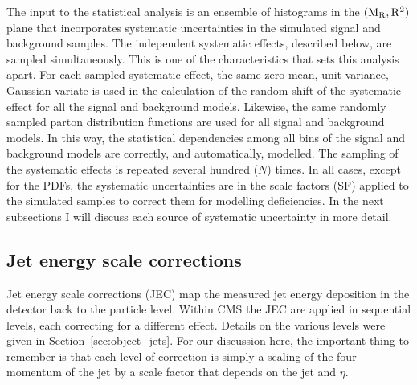 
 
The input to the statistical analysis is an ensemble of histograms in the $(\mathrm{M_R},\mathrm{R^2})$ plane that 
incorporates systematic uncertainties in the simulated signal and background samples.  
The independent systematic effects, described below, are sampled simultaneously. 
This is one of the characteristics that sets this analysis apart. 
For each sampled systematic effect, the same zero mean, unit variance, Gaussian variate is used in
the calculation of the random shift of the systematic effect for all the signal and background
models. Likewise, the same randomly sampled parton distribution functions are used for all
signal and background models. 
In this way, the statistical dependencies among all bins of the signal and background models are
correctly, and automatically, modelled. The sampling of the systematic effects
is repeated several hundred ($N$) times.  
In all cases, except for the PDFs, the systematic uncertainties are in the scale factors (SF) 
applied to the simulated samples to correct them for modelling deficiencies. 
In the next subsections I will discuss each source of systematic uncertainty in more detail. 




\subsection{Jet energy scale corrections \label{sec:boost_JEC}}  

Jet energy scale corrections (JEC) map the measured jet energy deposition in the detector back to
the particle level. Within CMS the JEC are applied in sequential levels, each correcting for a
different effect. Details on the various levels were given in Section~\ref{sec:object_jets}.
For our discussion here, the important thing to remember is that each level of correction is simply
a scaling of the four-momentum of the jet by a scale factor that depends on the jet \pt and $\eta$.

